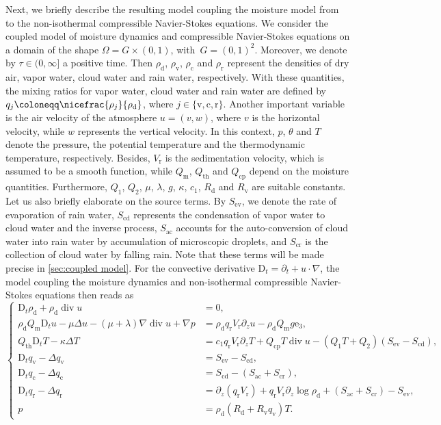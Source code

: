 \documentclass[10pt]{amsart}
\theoremstyle{plain}
\theoremstyle{definition}
\theoremstyle{thm}
\numberwithin{equation}{section}
\newcommand{\rD}{\mathrm{D}}
\DeclareMathOperator{\mdiv}{div}
\newcommand{\mre}{\mathrm{e}}
\newcommand{\del}{\partial}
\newcommand{\rd}{\mathrm{d}}
\renewcommand{\rm}{\mathrm{m}}
\newcommand{\rr}{\mathrm{r}}
\newcommand{\rv}{\mathrm{v}}
\newcommand{\rc}{\mathrm{c}}
\newcommand{\rev}{\mathrm{ev}}
\newcommand{\rcd}{\mathrm{cd}}
\newcommand{\rac}{\mathrm{ac}}
\newcommand{\rcr}{\mathrm{cr}}
\newcommand{\rth}{\mathrm{th}}
\newcommand{\rcp}{\mathrm{cp}}
\begin{document}
Next, we briefly describe the resulting model coupling the moisture model from \cite{HK:18} to the non-isothermal compressible Navier-Stokes equations.
We consider the coupled model of moisture dynamics and compressible Navier-Stokes equations on a domain of the shape $\Omega= G \times (0,1)$, with~$G = (0,1)^2$.
Moreover, we denote by $\tau \in (0,\infty]$ a positive time.
Then $\rho_\rd$, $\rho_\rv$, $\rho_\rc$ and $\rho_\rr$ represent the densities of dry air, vapor water, cloud water and rain water, respectively.
With these quantities, the mixing ratios for vapor water, cloud water and rain water are defined by $q_j \coloneqq \nicefrac{\rho_j}{\rho_\rd}$, where $j \in \{\rv,\rc,\rr\}$.
Another important variable is the air velocity of the atmosphere $u = (v,w)$, where $v$ is the horizontal velocity, while $w$ represents the vertical velocity.
In this context, $p$, $\theta$ and $T$ denote the pressure, the potential temperature and the thermodynamic temperature, respectively.
Besides, $V_\rr$ is the sedimentation velocity, which is assumed to be a smooth function, while $Q_\rm$, $Q_\rth$ and $Q_\rcp$ depend on the moisture quantities.
Furthermore, $Q_1$, $Q_2$, $\mu$, $\lambda$, $g$, $\kappa$, $c_1$, $R_\rd$ and $R_\rv$ are suitable constants.
Let us also briefly elaborate on the source terms.
By $S_\rev$, we denote the rate of evaporation of rain water, $S_\rcd$ represents the condensation of vapor water to cloud water and the inverse process, $S_\rac$ accounts for the auto-conversion of cloud water into rain water by accumulation of microscopic droplets, and $S_\rcr$ is the collection of cloud water by falling rain.
Note that these terms will be made precise in \autoref{sec:coupled model}.
For the convective derivative $\rD_t = \partial_t + u \cdot \nabla$, the model coupling the moisture dynamics and non-isothermal compressible Navier-Stokes equations then reads as 
\begin{equation}\label{eq:coupled moisture compr NSE comp}
    \left\{
    \begin{aligned}
        \rD_t\rho_{\rd}+\rho_{\rd} \mdiv u
        &=0,\\
        \rho_\rd Q_\rm\rD_t u-\mu\Delta u-(\mu+\lambda)\nabla\mdiv u+\nabla p
        &=\rho_{\rd}q_{\rr}V_{\rr}\partial_{z}u-\rho_{\rd}Q_{\rm}g \mre_{3},\\
        Q_{\rth} \rD_t T-\kappa \Delta T
        &=c_1 q_{\rr}V_{\rr}\partial_{z}T + Q_{\rcp} T \mdiv u- (Q_1 T + Q_2)(S_\rev - S_\rcd),\\
        \rD_t q_{\rv}-\Delta q_{\rv} 
        &= S_\rev - S_\rcd,\\
		\rD_t q_{\rc}-\Delta q_{\rc}
        &= S_\rcd - (S_\rac + S_\rcr),\\
		\rD_t q_{\rr}-\Delta q_{\rr}
        &= \del_z(q_\rr V_\rr) + q_\rr V_\rr \del_z \log \rho_\rd + (S_\rac + S_\rcr) - S_\rev,\\
		p
        &=\rho_{\rd}(R_\rd+R_\rv q_{\rv}) T.
    \end{aligned}
    \right.
\end{equation}
\end{document}
